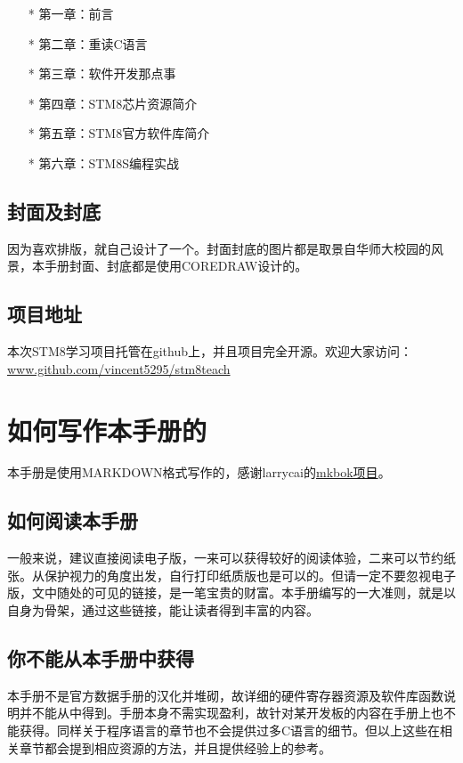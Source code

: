 \documentclass[a4paper]{book}
\begin{document}
\begin{itemize}\setlength{\itemsep}{1pt}\setlength{\parskip}{0pt}\setlength{\parsep}{0pt}
\item[*]
  第一章：前言
\item[*]
  第二章：重读C语言
\item[*]
  第三章：软件开发那点事
\item[*]
  第四章：STM8芯片资源简介
\item[*]
  第五章：STM8官方软件库简介
\item[*]
  第六章：STM8S编程实战
\end{itemize}
\subsection*{封面及封底}

因为喜欢排版，就自己设计了一个。封面封底的图片都是取景自华师大校园的风景，本手册封面、封底都是使用COREDRAW设计的。

\subsection*{项目地址}

本次STM8学习项目托管在github上，并且项目完全开源。欢迎大家访问：\href{www.github.com/vincent5295/stm8teach}{www.github.com/vincent5295/stm8teach}

\section*{如何写作本手册的}

本手册是使用MARKDOWN格式写作的，感谢larrycai的\href{www.github.com/larrycai/mkbok}{mkbok项目}。

\subsection*{如何阅读本手册}

一般来说，建议直接阅读电子版，一来可以获得较好的阅读体验，二来可以节约纸张。从保护视力的角度出发，自行打印纸质版也是可以的。但请一定不要忽视电子版，文中随处的可见的链接，是一笔宝贵的财富。本手册编写的一大准则，就是以自身为骨架，通过这些链接，能让读者得到丰富的内容。

\subsection*{你不能从本手册中获得}

本手册不是官方数据手册的汉化并堆砌，故详细的硬件寄存器资源及软件库函数说明并不能从中得到。手册本身不需实现盈利，故针对某开发板的内容在手册上也不能获得。同样关于程序语言的章节也不会提供过多C语言的细节。但以上这些在相关章节都会提到相应资源的方法，并且提供经验上的参考。
\end{document}

